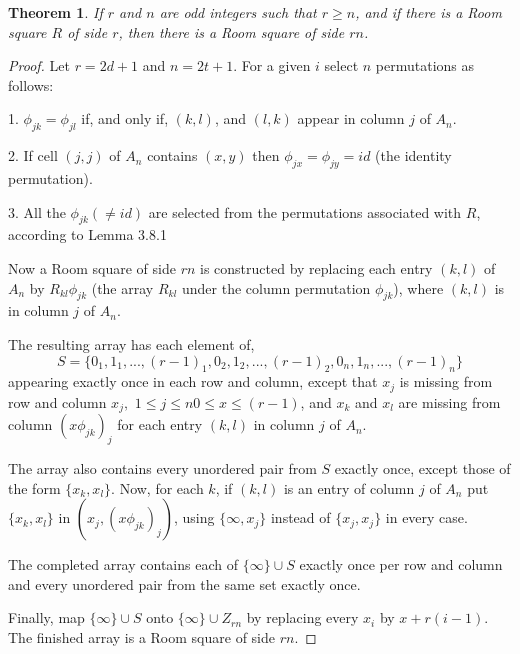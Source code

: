 \documentclass[
  11pt,
  a4paper]{book}
\newtheorem{theorem}{Theorem}
\begin{document}
\begin{theorem}
If $r$ and $n$ are odd integers such that $r \geq n$, and if
there is a Room square $R$ of side $r$, then there is a Room
square of side $rn$.
\end{theorem}

\begin{proof}
Let $r=2d+1$ and $n=2t+1$.
For a given $i$ select $n$ permutations as follows:

1.  $\phi _{jk} = \phi _{jl}$ if, and only if, $(k,l)$, and $(l,k)$
    appear in column $j$ of $A_n$.

2.  If cell $(j,j)$ of $A_n$ contains $(x,y)$ then
    $\phi _{jx}=\phi _{jy}=id$ (the identity permutation).

3.  All the $\phi _{jk} (\neq id)$ are selected from the permutations
    associated with $R$, according to Lemma 3.8.1

Now a Room square of side $rn$ is constructed by replacing
each entry $(k,l)$ of $A_n$ by $R_{kl} \phi _{jk}$ (the
array $R_{kl}$ under the column permutation $\phi _{jk}$),
where $(k,l)$ is in column $j$ of $A_n$.

The resulting array has each element of,
$$S = \{0_1,1_1,...,(r-1)_1,0_2,1_2,...,(r-1)_2,0_n,1_n,...,(r-1)_n\}$$
appearing exactly once in each row and column, except that
$x_j$ is missing from row and column
$x_j,$ $1 \leq j \leq n 0 \leq x \leq (r-1)$, and $x_k$ and
$x_l$ are missing from column $(x \phi _{jk})_j$ for each
entry $(k,l)$ in column $j$ of $A_n$.

The array also contains every unordered pair from $S$
exactly once, except those of the form $\{x_k,x_l\}$.  Now,
for each $k$, if $(k, l)$ is an entry of column $j$ of $A_n$
put $\{x_k, x_l\}$ in $(x_j, (x \phi _{jk})_j)$, using
$\{\infty, x_j\}$ instead of $\{x_j, x_j\}$ in every case.

The completed array contains each of $\{\infty\} \cup S$
exactly once per row and column and every unordered pair
from the same set exactly once.

Finally, map $\{\infty\} \cup S$ onto
$\{\infty \} \cup Z_{rn}$ by replacing every $x_i$ by
$x + r(i - 1)$. The finished array is a Room square
of side $rn$.
\end{proof}
\end{document}
